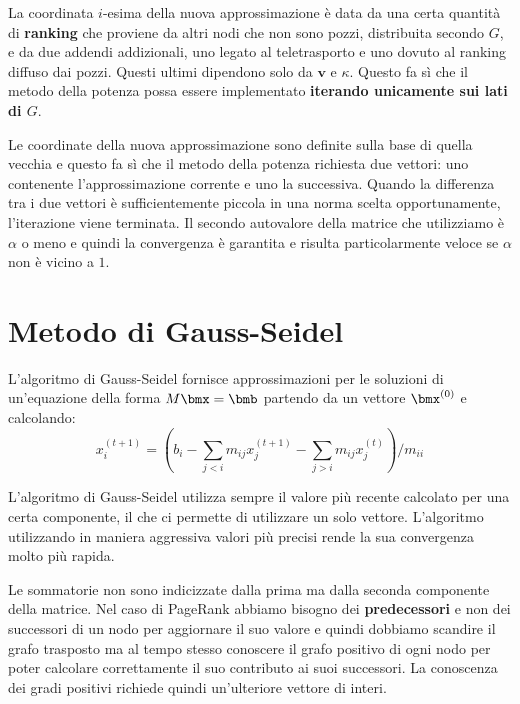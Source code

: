 \documentclass[\main/main.tex]{subfiles}
\begin{document}
\begin{multicols}{2}
\begin{observation}
    La coordinata \(i\)-esima della nuova approssimazione è data da una certa quantità di \textbf{ranking} che proviene da altri nodi che non sono pozzi, distribuita secondo \(G\), e da due addendi addizionali, uno legato al teletrasporto e uno dovuto al ranking diffuso dai pozzi. Questi ultimi dipendono solo da \(\bm{v}\) e \(\kappa\). Questo fa sì che il metodo della potenza possa essere implementato \textbf{iterando unicamente sui lati di \(G\)}.
\end{observation}
\begin{observation}
    Le coordinate della nuova approssimazione sono definite sulla base di quella vecchia e questo fa sì che il metodo della potenza richiesta due vettori: uno contenente l'approssimazione corrente e uno la successiva. Quando la differenza tra i due vettori è sufficientemente piccola in una norma scelta opportunamente, l'iterazione viene terminata. Il secondo autovalore della matrice che utilizziamo è \(\alpha\) o meno e quindi la convergenza è garantita e risulta particolarmente veloce se \(\alpha\) non è vicino a \(1\).
\end{observation}
\end{multicols}
\clearpage
\section{Metodo di Gauss-Seidel}
\begin{multicols}{2}
\begin{definition}
    L'algoritmo di Gauss-Seidel fornisce approssimazioni per le soluzioni di un'equazione della forma \(M\bmx = \bmb\) partendo da un vettore \(\bmx^{\rnd{0}}\) e calcolando:
    \[
        x_{i}^{(t+1)}=\left(b_{i}-\sum_{j<i} m_{i j} x_{j}^{(t+1)}-\sum_{j>i} m_{i j} x_{j}^{(t)}\right) / m_{i i}
    \]
\end{definition}
\begin{observation}
    L'algoritmo di Gauss-Seidel utilizza sempre il valore più recente calcolato per una certa componente, il che ci permette di utilizzare un solo vettore. L'algoritmo utilizzando in maniera aggressiva valori più precisi rende la sua convergenza molto più rapida.
\end{observation}
\begin{observation}
    Le sommatorie non sono indicizzate dalla prima ma dalla seconda componente della matrice. Nel caso di PageRank abbiamo bisogno dei \textbf{predecessori} e non dei successori di un nodo per aggiornare il suo valore e quindi dobbiamo scandire il grafo trasposto ma al tempo stesso conoscere il grafo positivo di ogni nodo per poter calcolare correttamente il suo contributo ai suoi successori. La conoscenza dei gradi positivi richiede quindi un'ulteriore vettore di interi.
\end{observation}
\end{multicols}
\end{document}
